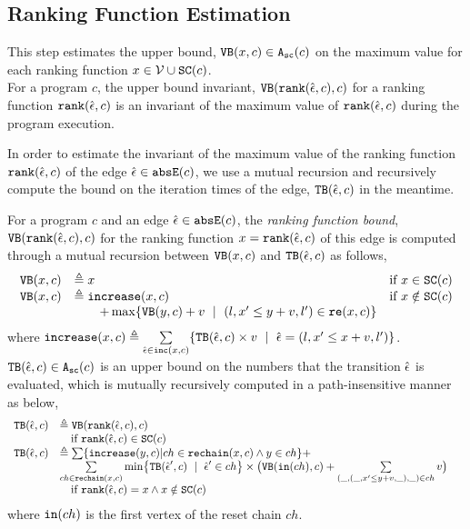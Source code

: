  \subsection{Ranking Function Estimation}
 This step estimates the upper bound, ${\mathtt{VB}}(x, c) \in {\ensuremath{\mathtt{A_{sc}}}}(c)$
 on the maximum value for each ranking function $x \in \mathcal{V} \cup \mathtt{SC}(c)$.
 \\
 For a program $c$, the upper bound invariant,
 ${\mathtt{VB}}(\mathtt{rank}(\hat{\mathtt{\epsilon}{}}, c), c)$ for a ranking function $\mathtt{rank}(\hat{\mathtt{\epsilon}{}}, c)$ 
 is an invariant of the maximum value of $\mathtt{rank}(\hat{\mathtt{\epsilon}{}}, c)$ during the program execution.

 In order to estimate the invariant of the maximum value of the ranking function $\mathtt{rank}(\hat{\mathtt{\epsilon}{}}, c)$
 of the edge $\hat{\mathtt{\epsilon}{}} \in \mathtt{abs}{\mathtt{E}}(c)$, we use a mutual recursion and recursively compute
 the bound on the iteration times of the edge, ${\mathtt{TB}}(\hat{\mathtt{\epsilon}{}}, c)$ in the meantime.
 \begin{defn}
 \label{def:ranking_bound}
 For a program $c$ and an edge $\hat{\mathtt{\epsilon}{}} \in \mathtt{abs}{\mathtt{E}}(c)$,
 the \emph{ranking function bound}, 
 ${\mathtt{VB}}(\mathtt{rank}(\hat{\mathtt{\epsilon}{}}, c), c)$ for the ranking function $x = \mathtt{rank}(\hat{\mathtt{\epsilon}{}}, c)$
 of this edge
 is computed through a mutual recursion between ${\mathtt{VB}}(x, c)$ and ${\mathtt{TB}}(\hat{\mathtt{\epsilon}{}}, c)$ as follows,
 \[ 
 \begin{array}{lll}
 \varinvar(x, c) & \triangleq x & \text{if} ~ x \in \scvar(c) \\
 \varinvar(x, c) & \triangleq \incrs(x, c) & \text{if} ~ x \notin \scvar(c) \\
 & \qquad + \max\left\{\varinvar(y, c) + v ~\mid~ (l, x' \leq y + v, l') \in \reset(x, c) \right\} &
 \end{array}
 \]
 where $\mathtt{increase}(x, c) \triangleq \sum\limits_{\hat{\mathtt{\epsilon}{}} \in \mathtt{inc}(x, c)}\{{\mathtt{TB}}(\hat{\mathtt{\epsilon}{}}, c) \times v ~\mid~ \hat{\mathtt{\epsilon}{}} = (l, x' \leq x + v, l')\}$.
${\mathtt{TB}}(\hat{\mathtt{\epsilon}{}}, c) \in {\ensuremath{\mathtt{A_{sc}}}}(c)$ is an upper bound on the numbers that the transition $\hat{\mathtt{\epsilon}{}}$ is evaluated, which is mutually recursively computed in a path-insensitive manner as below,
\[ 
\begin{array}{lll}
 \absclr(\absevent, c) 
 & \triangleq \varinvar(\rank(\absevent, c), c) & \\
 & \quad \text{if} ~ \rank(\absevent, c) \in \scvar(c) & \\
 \absclr(\absevent, c) 
 & \triangleq
 \sum \left\{ \incrs(y, c) | ch \in \resetchain(x, c) \land y \in ch \right\} +  & \\
 & 
 \sum\limits_{ch \in \resetchain(x, c)}
 \min \left\{\absclr(\absevent', c) ~\mid~ \absevent' \in ch\right\} \times 
 \big(\varinvar(\kw{in}(ch), c) 
 + \sum\limits_{(\_, (\_, x' \leq y + v, \_), \_) \in ch} v \big) & \\
 & \quad \text{if} ~\rank(\absevent, c) = x \land x \notin \scvar(c) & 
\end{array}
 \]
 where $\mathtt{in}(ch)$ is the first vertex of the reset chain $ch$.
\end{defn}

